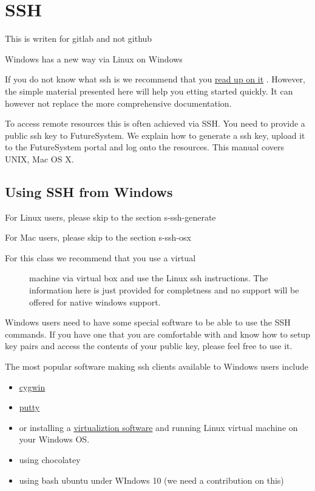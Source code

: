 \chapter{SSH}
\label{C:ssh}

\begin{WARNING}
This is writen for gitlab and not github
\end{WARNING}

\begin{WARNING}
Windows has a new way via Linux on Windows
\end{WARNING}


If you do not know what ssh is we recommend that you
\href{http://openssh.com/manual.html}{read up on it} . However, the
simple material presented here will help you etting started quickly. It
can however not replace the more comprehensive documentation.

To access remote resources this is often achieved via SSH. You need to
provide a public ssh key to FutureSystem. We explain how to generate a
ssh key, upload it to the FutureSystem portal and log onto the
resources. This manual covers UNIX, Mac OS X.

\section{Using SSH from Windows}\label{using-ssh-from-windows}

For Linux users, please skip to the section s-ssh-generate

For Mac users, please skip to the section s-ssh-osx

\begin{description}
\item[For this class we recommend that you use a virtual]
machine via virtual box and use the Linux ssh instructions. The
information here is just provided for completness and no support will be
offered for native windows support.
\end{description}

Windows users need to have some special software to be able to use the
SSH commands. If you have one that you are comfortable with and know how
to setup key pairs and access the contents of your public key, please
feel free to use it.

The most popular software making ssh clients available to Windows users
include

\begin{itemize}
\tightlist
\item
  \href{http://cygwin.com/install.html}{cygwin}
\item
  \href{http://the.earth.li/~sgtatham/putty/0.62/htmldoc/}{putty}
\item
  or installing a \href{http://cygwin.com/install.html}{virtualiztion
  software} and running Linux virtual machine on your Windows OS.
\item
  using chocolatey
\item
  using bash ubuntu under WIndows 10 (we need a contribution on this)
\end{itemize}

